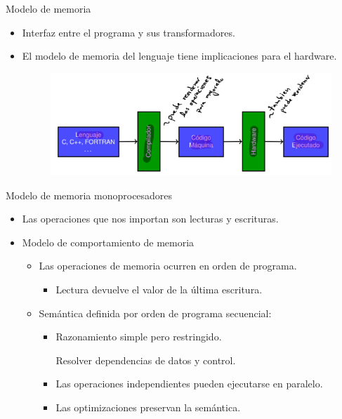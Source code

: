 \documentclass[12pt, twoside, openright]{report} %
\begin{document}
    Modelo de memoria

    \begin{itemize}
    
    \item
      Interfaz entre el programa y sus transformadores.
    \item
      El modelo de memoria del lenguaje tiene implicaciones para el
      hardware.

      \begin{figure}[H]
        {\includegraphics[scale=.5]{Untitled 57.png}}
      \end{figure}
    \end{itemize}

    Modelo de memoria monoprocesadores

    \begin{itemize}
    
    \item
      Las operaciones que nos importan son lecturas y escrituras.
    \item
      Modelo de comportamiento de memoria

      \begin{itemize}
      
      \item
        Las operaciones de memoria ocurren en orden de programa.

        \begin{itemize}
        
        \item
          Lectura devuelve el valor de la última escritura.
        \end{itemize}
      \item
        Semántica definida por orden de programa secuencial:

        \begin{itemize}
        
        \item
          Razonamiento simple pero restringido.

            Resolver dependencias de datos y control.

            \item
          Las operaciones independientes pueden ejecutarse en
          paralelo.
        \item
          Las optimizaciones preservan la semántica.
        \end{itemize}
      \end{itemize}
    \end{itemize}
\end{document}

